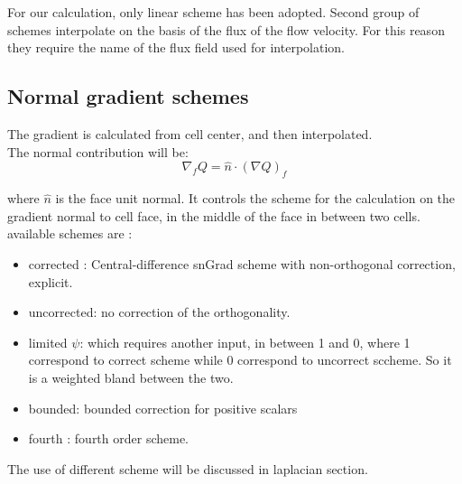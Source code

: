 \documentclass[a4paper,12pt]{article}
\begin{document}

For our calculation, only linear scheme has been adopted. Second group of schemes interpolate on the basis of the flux of the flow velocity. For this reason they require the name of the flux field used for interpolation.


\subsection{Normal gradient schemes}
The gradient is calculated from cell center, and then interpolated. 
\\The normal contribution will be: 
\begin{equation}
\nabla_f Q = \hat{n} \cdot (\nabla Q )_f
\end{equation}

where $\hat{n}$ is the face unit normal. It controls the scheme for the calculation on the gradient normal to cell face, in the middle of the face in between two cells. available schemes are : \\
\begin{itemize} 

 \item {\ttfamily corrected} : Central-difference snGrad scheme with non-orthogonal correction, explicit.
  \item {\ttfamily uncorrected}: no correction of the orthogonality.
 \item {\ttfamily limited $\psi$}: which requires another input, in between 1 and 0, where 1 correspond to correct scheme while 0 correspond to uncorrect sccheme. So it is a weighted bland between the two.
 \item {\ttfamily bounded}: bounded correction for positive scalars
 \item {\ttfamily fourth} : fourth order scheme.
\end{itemize} 

The use of different scheme will be discussed in laplacian section.
\end{document}
